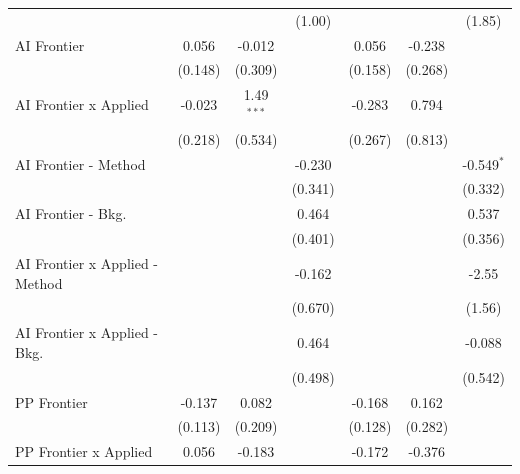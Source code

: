 \begin{tabular}{lcccccc}
                                  &               &              & (1.00)        &               &              & (1.85)\\   
   AI Frontier                    & 0.056         & -0.012       &               & 0.056         & -0.238       &   \\   
                                  & (0.148)       & (0.309)      &               & (0.158)       & (0.268)      &   \\   
   AI Frontier x Applied          & -0.023        & 1.49$^{***}$ &               & -0.283        & 0.794        &   \\   
                                  & (0.218)       & (0.534)      &               & (0.267)       & (0.813)      &   \\   
   AI Frontier - Method           &               &              & -0.230        &               &              & -0.549$^{*}$\\   
                                  &               &              & (0.341)       &               &              & (0.332)\\   
   AI Frontier - Bkg.             &               &              & 0.464         &               &              & 0.537\\   
                                  &               &              & (0.401)       &               &              & (0.356)\\   
   AI Frontier x Applied - Method &               &              & -0.162        &               &              & -2.55\\   
                                  &               &              & (0.670)       &               &              & (1.56)\\   
   AI Frontier x Applied - Bkg.   &               &              & 0.464         &               &              & -0.088\\   
                                  &               &              & (0.498)       &               &              & (0.542)\\   
   PP Frontier                    & -0.137        & 0.082        &               & -0.168        & 0.162        &   \\   
                                  & (0.113)       & (0.209)      &               & (0.128)       & (0.282)      &   \\   
   PP Frontier x Applied          & 0.056         & -0.183       &               & -0.172        & -0.376       &   \\   

\end{tabular}
